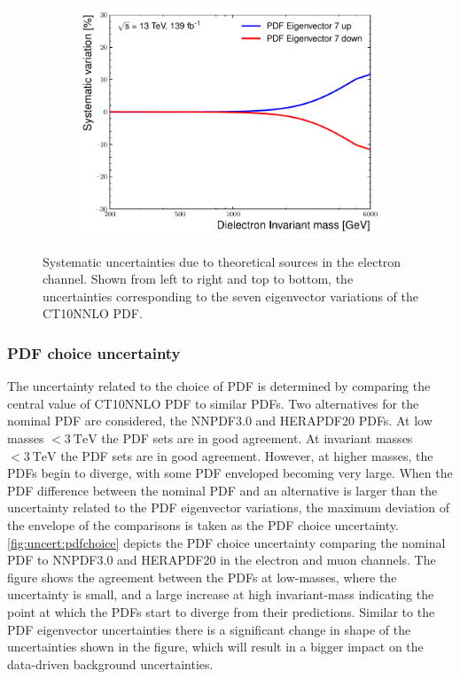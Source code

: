 \begin{figure}[h!]
\begin{subfigure}[b]{0.42\textwidth}
        \includegraphics[width=\textwidth]{figures/analysis/datamc/Uncertainties/theory/ee/backgroundTemplate_KF_PDF_EV7.pdf}
        \label{fig:uncert:eepdfvar7}
    \end{subfigure}
    \caption{Systematic uncertainties due to theoretical sources in the electron channel. Shown from left to right and top to bottom, the uncertainties corresponding to the seven eigenvector variations of the CT10NNLO PDF.}
    \label{fig:ucnert:eepdfvar}
\end{figure}

\subsubsection{PDF choice uncertainty}
The uncertainty related to the choice of PDF is determined by comparing the central value of CT10NNLO PDF to similar PDFs. Two alternatives for the nominal PDF are considered, the NNPDF3.0 and HERAPDF20 PDFs. At low masses $< \SI{3}{\tera\electronvolt}$ the PDF sets are in good agreement. At invariant masses $< \SI{3}{\tera\electronvolt}$ the PDF sets are in good agreement. However, at higher masses, the PDFs begin to diverge, with some PDF enveloped becoming very large. When the PDF difference between the nominal PDF and an alternative is larger than the uncertainty related to the PDF eigenvector variations, the maximum deviation of the envelope of the comparisons is taken as the PDF choice uncertainty. \cref{fig:uncert:pdfchoice} depicts the PDF choice uncertainty comparing the nominal PDF to NNPDF3.0 and HERAPDF20 in the electron and muon channels. The figure shows the agreement between the PDFs at low-masses, where the uncertainty is small, and a large increase at high invariant-mass indicating the point at which the PDFs start to diverge from their predictions. Similar to the PDF eigenvector uncertainties there is a significant change in shape of the uncertainties shown in the figure, which will result in a bigger impact on the data-driven background uncertainties. 

